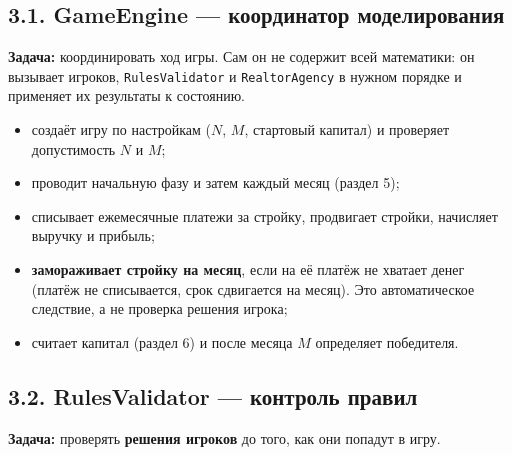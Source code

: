 \documentclass[
]{article}
\providecommand{\tightlist}{%
  \setlength{\itemsep}{0pt}\setlength{\parskip}{0pt}}
\begin{document}
\subsection{3.1. GameEngine --- координатор
моделирования}\label{gameengine-ux43aux43eux43eux440ux434ux438ux43dux430ux442ux43eux440-ux43cux43eux434ux435ux43bux438ux440ux43eux432ux430ux43dux438ux44f}

\textbf{Задача:} координировать ход игры. Сам он не содержит всей
математики: он вызывает игроков, \texttt{RulesValidator} и
\texttt{RealtorAgency} в нужном порядке и применяет их результаты к
состоянию.

\begin{itemize}
\tightlist
\item
  создаёт игру по настройкам (\(N\), \(M\), стартовый капитал) и
  проверяет допустимость \(N\) и \(M\);
\item
  проводит начальную фазу и затем каждый месяц (раздел 5);
\item
  списывает ежемесячные платежи за стройку, продвигает стройки,
  начисляет выручку и прибыль;
\item
  \textbf{замораживает стройку на месяц}, если на её платёж не хватает
  денег (платёж не списывается, срок сдвигается на месяц). Это
  автоматическое следствие, а не проверка решения игрока;
\item
  считает капитал (раздел 6) и после месяца \(M\) определяет победителя.
\end{itemize}

\subsection{3.2. RulesValidator --- контроль
правил}\label{rulesvalidator-ux43aux43eux43dux442ux440ux43eux43bux44c-ux43fux440ux430ux432ux438ux43b}

\textbf{Задача:} проверять \textbf{решения игроков} до того, как они
попадут в игру.
\end{document}
